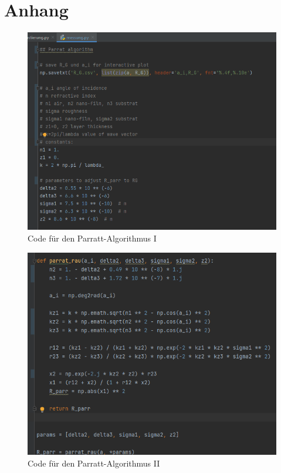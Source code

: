 \newpage
\section{Anhang}
\label{sec:anhang}
\begin{figure}[h!]
  \centering
  \includegraphics[scale=0.7]{fig/parrat1.png}
  \caption{Code für den Parratt-Algorithmus I}
  \label{abb:mess1}
\end{figure}
\begin{figure}[h!]
  \centering
  \includegraphics[scale=0.7]{fig/parratt2.png}
  \caption{Code für den Parratt-Algorithmus II}
  \label{abb:mess2}
\end{figure}
